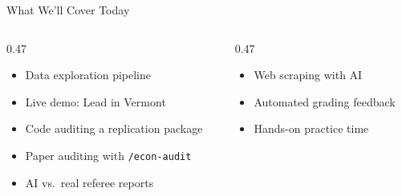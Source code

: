 \documentclass[aspectratio=169, 10pt]{beamer}
\begin{document}
\begin{frame}{What We'll Cover Today}
\begin{columns}[T]
\begin{column}{0.47\textwidth}
\begin{tcolorbox}[keybox, title={\faFlask\quad Emily: Research Workflows}]
\small
\begin{itemize}\setlength{\itemsep}{2pt}
  \item Data exploration pipeline
  \item Live demo: Lead in Vermont
  \item Code auditing a replication package
  \item Paper auditing with \texttt{/econ-audit}
  \item AI vs.\ real referee reports
\end{itemize}
\end{tcolorbox}
\end{column}
\begin{column}{0.47\textwidth}
\begin{tcolorbox}[keybox, title={\faGlobe\quad Erkmen: Data \& Grading}]
\small
\begin{itemize}\setlength{\itemsep}{2pt}
  \item Web scraping with AI
  \item Automated grading feedback
  \item Hands-on practice time
\end{itemize}
\end{tcolorbox}
\end{column}
\end{columns}
\end{frame}
\end{document}
